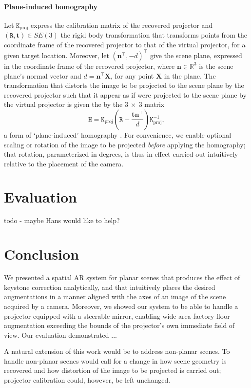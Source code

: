 \documentclass[review]{elsarticle}
\begin{document}
\paragraph{Plane-induced homography} Let $\mathtt{K}_\text{proj}$ express the calibration matrix of the recovered projector and $(\mathtt{R}, \mathbf{t}) \in SE(3)$ the rigid body transformation that transforms points from the coordinate frame of the recovered projector to that of the virtual projector, for a given target location. Moreover, let $(\mathbf{n}^\top, -d)^\top$ give the scene plane, expressed in the coordinate frame of the recovered projector, where $\mathbf{n} \in \mathbb{R}^3$ is the scene plane's normal vector and $d = \mathbf{n}^\top\mathbf{X}$, for any point $\mathbf{X}$ in the plane. The transformation that distorts the image to be projected to the scene plane by the recovered projector such that it appear as if were projected to the scene plane by the virtual projector is given the by the $3~\times~3$ matrix
\begin{equation}
\mathtt{H} = \mathtt{K}_\text{proj}\left(\mathtt{R} - \frac{\mathbf{t}\mathbf{n}^\top}{d}\right)\mathtt{K}_\text{proj}^{-1},
\label{homgen}
\end{equation}
a form of `plane-induced' homography \cite{Hartley2004}. For convenience, we enable optional scaling or rotation of the image to be projected \textit{before} applying the homography; that rotation, parameterized in degrees, is thus in effect carried out intuitively relative to the placement of the camera.

\section{Evaluation}

todo - maybe Hans would like to help?

\section{Conclusion}

We presented a spatial AR system for planar scenes that produces the effect of keystone correction analytically, and that intuitively places the desired augmentations in a manner aligned with the axes of an image of the scene acquired by a camera. Moreover, we showed our system to be able to handle a projector equipped with a steerable mirror, enabling wide-area factory floor augmentation exceeding the bounds of the projector's own immediate field of view. Our evaluation demonstrated ...

A natural extension of this work would be to address non-planar scenes. To handle non-planar scenes would call for a change in how scene geometry is recovered and how distortion of the image to be projected is carried out; projector calibration could, however, be left unchanged.


\end{document}
